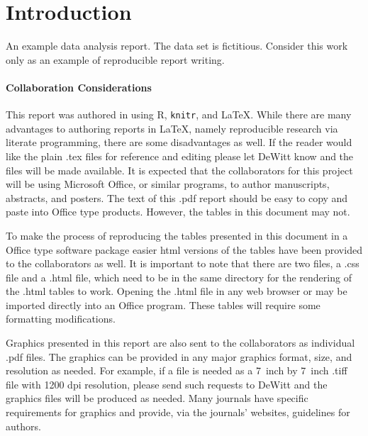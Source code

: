 % 
%
% 

\section{Introduction \label{sec:introduction}}

An example data analysis report.  The data set is fictitious.  Consider this work
only as an example of reproducible report writing.

\paragraph{Collaboration Considerations}

This report was authored in using R, {\tt knitr}, and  \LaTeX.  While there are
many advantages to authoring reports in \LaTeX, namely reproducible research via
literate programming, there are some disadvantages as well.  If the reader would
like the plain .tex files for reference and editing please let DeWitt know and
the files will be made available.  It is expected that the collaborators for
this project will be using Microsoft Office, or similar programs, to author
manuscripts, abstracts, and posters.  The text of this .pdf report should be
easy to copy and paste into Office type products.  However, the tables in this
document may not.  

To make the process of reproducing the tables presented in this document in a
Office type software package easier html versions of the tables have been
provided to the collaborators as well.  It is important to note that there are
two files, a .css file and a .html file, which need to be in the same directory
for the rendering of the .html tables to work.  Opening the .html file in any
web browser or may be imported directly into an Office program.  These tables
will require some formatting modifications.  

Graphics presented in this report are also sent to the collaborators as
individual .pdf files.  The graphics can be provided in any major graphics
format, size, and resolution as needed.  For example, if a file is needed as a
7~inch by 7~inch .tiff file with 1200 dpi resolution, please send such requests
to DeWitt and the graphics files will be produced as needed.  Many journals have
specific requirements for graphics and provide, via the journals' websites,
guidelines for authors.


